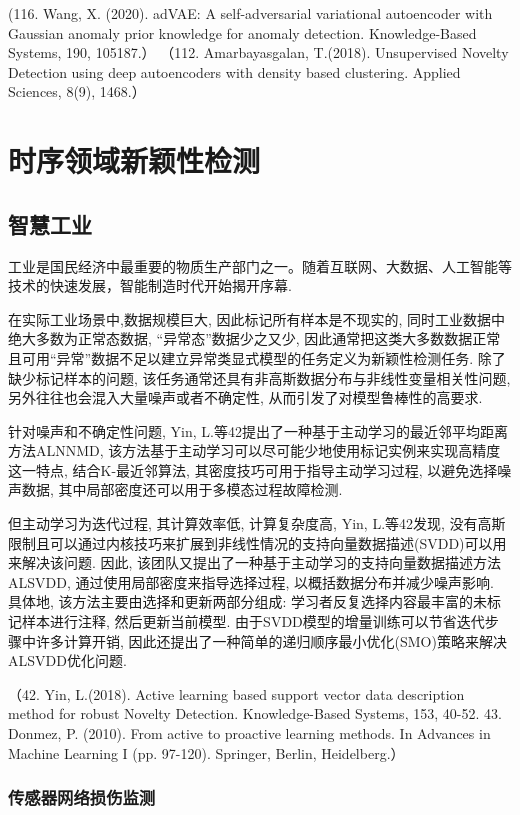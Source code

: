 \documentclass{Style/aas}
\begin{document}
\begin{multicols}{2}
  (116.	Wang, X. (2020). adVAE: A self-adversarial variational autoencoder with Gaussian anomaly prior knowledge for anomaly detection. Knowledge-Based Systems, 190, 105187.）
  （112.	Amarbayasgalan, T.(2018). Unsupervised Novelty Detection using deep autoencoders with density based clustering. Applied Sciences, 8(9), 1468.）



  \section{时序领域新颖性检测}
  \subsection{智慧工业}

  工业是国民经济中最重要的物质生产部门之一。随着互联网、大数据、人工智能等技术的快速发展，智能制造时代开始揭开序幕.

  在实际工业场景中,数据规模巨大, 因此标记所有样本是不现实的, 同时工业数据中绝大多数为正常态数据, “异常态”数据少之又少, 因此通常把这类大多数数据正常且可用“异常”数据不足以建立异常类显式模型的任务定义为新颖性检测任务. 除了缺少标记样本的问题, 该任务通常还具有非高斯数据分布与非线性变量相关性问题, 另外往往也会混入大量噪声或者不确定性, 从而引发了对模型鲁棒性的高要求.

  针对噪声和不确定性问题, Yin, L.等42提出了一种基于主动学习的最近邻平均距离方法ALNNMD, 该方法基于主动学习可以尽可能少地使用标记实例来实现高精度这一特点, 结合K-最近邻算法, 其密度技巧可用于指导主动学习过程, 以避免选择噪声数据, 其中局部密度还可以用于多模态过程故障检测.

  但主动学习为迭代过程, 其计算效率低, 计算复杂度高, Yin, L.等42发现, 没有高斯限制且可以通过内核技巧来扩展到非线性情况的支持向量数据描述(SVDD)可以用来解决该问题. 因此, 该团队又提出了一种基于主动学习的支持向量数据描述方法ALSVDD, 通过使用局部密度来指导选择过程, 以概括数据分布并减少噪声影响. 具体地, 该方法主要由选择和更新两部分组成: 学习者反复选择内容最丰富的未标记样本进行注释, 然后更新当前模型. 由于SVDD模型的增量训练可以节省迭代步骤中许多计算开销, 因此还提出了一种简单的递归顺序最小优化(SMO)策略来解决ALSVDD优化问题.

  （42.	Yin, L.(2018). Active learning based support vector data description method for robust Novelty Detection. Knowledge-Based Systems, 153, 40-52.
  43.	Donmez, P. (2010). From active to proactive learning methods. In Advances in Machine Learning I (pp. 97-120). Springer, Berlin, Heidelberg.）

  \subsubsection{传感器网络损伤监测}


\end{multicols}
\end{document}
